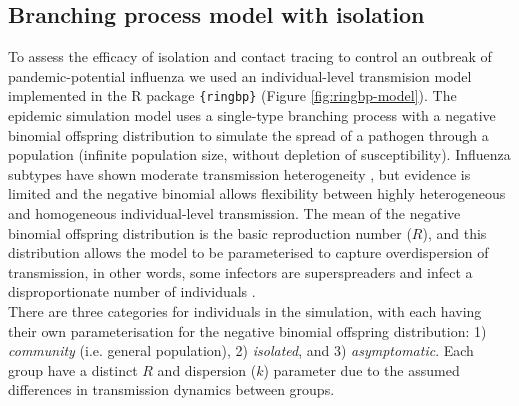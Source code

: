\documentclass{article}
\begin{document}
\subsection*{Branching process model with isolation}

To assess the efficacy of isolation and contact tracing to control an outbreak of pandemic-potential influenza we used an individual-level transmision model implemented in the R package \texttt{\{ringbp\}} \citep{hellewellRingbpSimulateEvaluate2025} (Figure \ref{fig:ringbp-model}). The epidemic simulation model uses a single-type branching process with a negative binomial offspring distribution to simulate the spread of a pathogen through a population (infinite population size, without depletion of susceptibility). Influenza subtypes have shown moderate transmission heterogeneity \citep{fraserPandemicPotentialStrain2009, heComparingCOVID191918192020, Ward2024.12.11.24318702}, but evidence is limited and the negative binomial allows flexibility between highly heterogeneous and homogeneous individual-level transmission. The mean of the negative binomial offspring distribution is the basic reproduction number ($R$), and this distribution allows the model to be parameterised to capture overdispersion of transmission, in other words, some infectors are superspreaders and infect a disproportionate number of individuals \citep{lloyd-smithSuperspreadingEffectIndividual2005, kucharskiEarlyDynamicsTransmission2020}. \\

There are three categories for individuals in the simulation, with each having their own parameterisation for the negative binomial offspring distribution: 1) \textit{community} (i.e. general population), 2) \textit{isolated}, and 3) \textit{asymptomatic}. Each group have a distinct $R$ and dispersion ($k$) parameter due to the assumed differences in transmission dynamics between groups. \\
\end{document}
